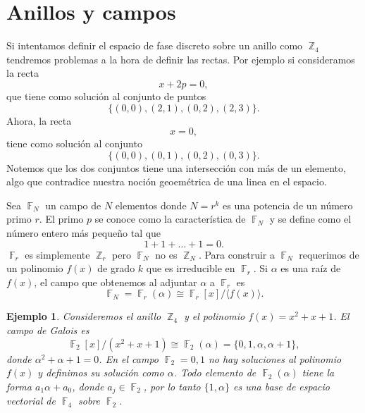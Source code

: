 \documentclass[a4paper]{report}
\DeclareMathOperator{\Z}{\mathbb{Z}}
\DeclareMathOperator{\F}{\mathbb{F}}
\newtheorem{example}{Ejemplo}
\begin{document}
  \section{Anillos y campos}

  Si intentamos definir el espacio de fase discreto sobre un
  anillo como $\Z_4$ tendremos problemas a la hora de
  definir las rectas. Por ejemplo si consideramos la recta
  \[
    x + 2p = 0,
  \]
  que tiene como solución al conjunto de puntos
  \[
    \{(0,0), (2,1), (0,2), (2,3)\}.
  \] 
  Ahora, la recta 
  \[
    x = 0,
  \] 
  tiene como solución al conjunto
  \[
    \{(0,0), (0,1), (0,2), (0,3)\}.
  \] 
  Notemos que los dos conjuntos tiene una intersección con
  más de un elemento, algo que contradice nuestra noción
  geoemétrica de una linea en el espacio.

  Sea $\F_N$ un campo de $N$ elementos donde $N = r^{k}$ es
  una potencia de un número primo $r$. El primo $p$ se
  conoce como la característica de $\F_N$ y se define como
  el número entero más pequeño tal que
  \[
    1 + 1 + \ldots + 1 = 0.
  \] 
  $\F_r$ es simplemente $\Z_r$ pero $\F_N$ no es $\Z_N$.
  Para construir a $\F_N$ requerimos de un polinomio $f(x)$ 
  de grado $k$ que es irreducible en $\F_r$. Si $\alpha$ es
  una raíz de $f(x)$, el campo que obtenemos al adjuntar
  $\alpha$ a $\F_r$ es
  \[
    \F_N
    = \F_r(\alpha) \cong \F_r[x] / \langle f(x) \rangle.
  \] 
  \begin{example}
    Consideremos el anillo $\Z_4$ y el polinomio $f(x) = x^2
    + x + 1$. El campo de Galois es
    \[
      \F_2[x] / (x^2 + x + 1)
      \cong \F_2(\alpha)
      = \{0, 1, \alpha, \alpha + 1\},
    \] 
    donde $\alpha^2 + \alpha + 1 = 0$. En el campo $\F_2 =
    {0,1}$ no hay soluciones al polinomio $f(x)$ y definimos
    su solución como $\alpha$. Todo elemento de
    $\F_2(\alpha)$ tiene la forma $a_1 \alpha + a_0$, donde
    $a_j \in \F_2$, por lo tanto $\{1, \alpha\}$ es una base
    de espacio vectorial de $\F_4$ sobre $\F_2$.
  \end{example}
\end{document}
